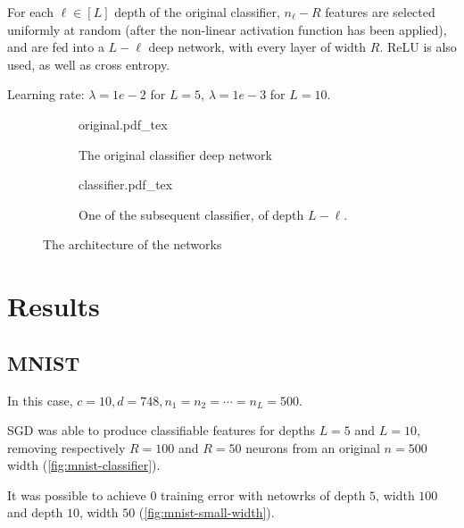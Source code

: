 \documentclass[a4paper]{article}
\begin{document}
For each $\ell \in [L]$ depth of the original classifier, $n_\ell - R$ features
are selected uniformly at random (after the non-linear activation function has
been applied), and are fed into a $L - \ell$ deep network, with every layer of
width $R$. ReLU is also used, as well as cross entropy.

Learning rate: $\lambda = 1e-2$ for $L = 5$, $\lambda = 1e-3$ for $L = 10$.


\begin{figure}[!ht]
    \centering
    \begin{subfigure}{0.48\textwidth}
        \centering
    {original.pdf_tex}
    \caption{The original classifier deep network}
\end{subfigure}
    \begin{subfigure}{0.48\textwidth}
    \centering
    {classifier.pdf_tex}
    \caption{One of the subsequent classifier, of depth $L-\ell$.}
\end{subfigure}
\caption{The architecture of the networks}
\end{figure}


\section{Results}

\subsection{MNIST}

In this case, $c = 10, d = 748, n_1 = n_2 = \cdots = n_L = 500$.


SGD was able to produce classifiable features for depths $L = 5$ and $L = 10$,
removing respectively $R = 100$ and $R = 50$ neurons from an original $n = 500$
width (\cref{fig:mnist-classifier}).

It was possible to achieve $0$ training error with netowrks of depth $5$, width
$100$ and depth $10$, width $50$ (\cref{fig:mnist-small-width}).
\end{document}
